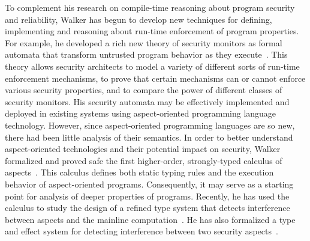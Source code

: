 To complement his research on compile-time reasoning about program
security and reliability, Walker has begun to develop new techniques for defining,
implementing and reasoning about run-time enforcement of program properties.
For example, he developed a rich new theory of security monitors as formal
automata that transform untrusted program behavior as they execute~\cite{ligatti+:edit-automata}.  This theory allows security
architects to model a variety of different sorts of run-time
enforcement mechanisms, to prove that certain mechanisms can or cannot
enforce various security properties, and to compare the power of
different classes of security monitors.  His security automata may be
effectively implemented and deployed in existing systems
using aspect-oriented programming language
technology.  However, since aspect-oriented programming languages
are so new, there had been little analysis of their semantics.
In order to better understand aspect-oriented technologies and their
potential impact on security, Walker formalized and proved
safe the first higher-order, strongly-typed calculus of 
aspects~\cite{walker+:aspects}.  This calculus defines
both static typing rules and the execution behavior of aspect-oriented
programs.  Consequently, it may
serve as a starting point for analysis of deeper properties of programs.
Recently, he has used the calculus to study the design of a
refined type system that detects interference between aspects and
the mainline computation~\cite{dantas+:harmless-advice}.  He has also
formalized a type and effect system for detecting interference
between two security aspects~\cite{bauer+:non-interfering-monitors}.

